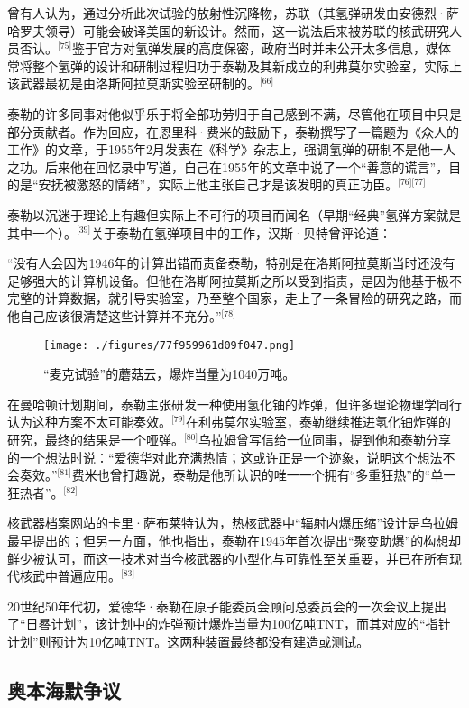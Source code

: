 曾有人认为，通过分析此次试验的放射性沉降物，苏联（其氢弹研发由安德烈·萨哈罗夫领导）可能会破译美国的新设计。然而，这一说法后来被苏联的核武研究人员否认。\(^\text{[75]}\)鉴于官方对氢弹发展的高度保密，政府当时并未公开太多信息，媒体常将整个氢弹的设计和研制过程归功于泰勒及其新成立的利弗莫尔实验室，实际上该武器最初是由洛斯阿拉莫斯实验室研制的。\(^\text{[66]}\)

泰勒的许多同事对他似乎乐于将全部功劳归于自己感到不满，尽管他在项目中只是部分贡献者。作为回应，在恩里科·费米的鼓励下，泰勒撰写了一篇题为《众人的工作》的文章，于1955年2月发表在《科学》杂志上，强调氢弹的研制不是他一人之功。后来他在回忆录中写道，自己在1955年的文章中说了一个“善意的谎言”，目的是“安抚被激怒的情绪”，实际上他主张自己才是该发明的真正功臣。\(^\text{[76][77]}\)

泰勒以沉迷于理论上有趣但实际上不可行的项目而闻名（早期“经典”氢弹方案就是其中一个）。\(^\text{[39]}\)关于泰勒在氢弹项目中的工作，汉斯·贝特曾评论道：

“没有人会因为1946年的计算出错而责备泰勒，特别是在洛斯阿拉莫斯当时还没有足够强大的计算机设备。但他在洛斯阿拉莫斯之所以受到指责，是因为他基于极不完整的计算数据，就引导实验室，乃至整个国家，走上了一条冒险的研究之路，而他自己应该很清楚这些计算并不充分。”\(^\text{[78]}\)
\begin{figure}[ht]
\centering
\texttt{[image: ./figures/77f959961d09f047.png]}
\caption{“麦克试验”的蘑菇云，爆炸当量为1040万吨。} \label{fig_ADHTL_10}
\end{figure}
在曼哈顿计划期间，泰勒主张研发一种使用氢化铀的炸弹，但许多理论物理学同行认为这种方案不太可能奏效。\(^\text{[79]}\)在利弗莫尔实验室，泰勒继续推进氢化铀炸弹的研究，最终的结果是一个哑弹。\(^\text{[80]}\)乌拉姆曾写信给一位同事，提到他和泰勒分享的一个想法时说：“爱德华对此充满热情；这或许正是一个迹象，说明这个想法不会奏效。”\(^\text{[81]}\)费米也曾打趣说，泰勒是他所认识的唯一一个拥有“多重狂热”的“单一狂热者”。\(^\text{[82]}\)

核武器档案网站的卡里·萨布莱特认为，热核武器中“辐射内爆压缩”设计是乌拉姆最早提出的；但另一方面，他也指出，泰勒在1945年首次提出“聚变助爆”的构想却鲜少被认可，而这一技术对当今核武器的小型化与可靠性至关重要，并已在所有现代核武中普遍应用。\(^\text{[83]}\)

20世纪50年代初，爱德华·泰勒在原子能委员会顾问总委员会的一次会议上提出了“日晷计划”，该计划中的炸弹预计爆炸当量为100亿吨TNT，而其对应的“指针计划”则预计为10亿吨TNT。这两种装置最终都没有建造或测试。
\subsection{奥本海默争议}
